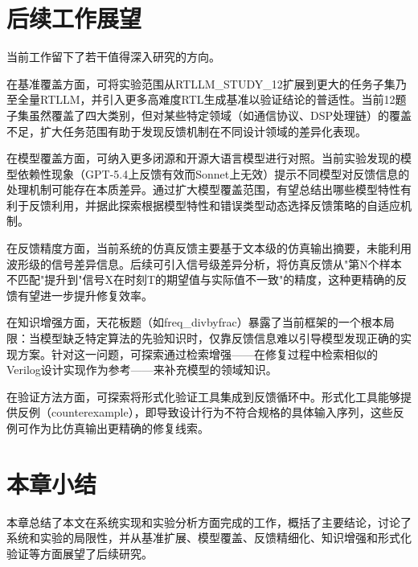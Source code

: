 \section{后续工作展望}

当前工作留下了若干值得深入研究的方向。

在基准覆盖方面，可将实验范围从RTLLM\_STUDY\_12扩展到更大的任务子集乃至全量RTLLM，并引入更多高难度RTL生成基准以验证结论的普适性。当前12题子集虽然覆盖了四大类别，但对某些特定领域（如通信协议、DSP处理链）的覆盖不足，扩大任务范围有助于发现反馈机制在不同设计领域的差异化表现。

在模型覆盖方面，可纳入更多闭源和开源大语言模型进行对照。当前实验发现的模型依赖性现象（GPT-5.4上反馈有效而Sonnet上无效）提示不同模型对反馈信息的处理机制可能存在本质差异。通过扩大模型覆盖范围，有望总结出哪些模型特性有利于反馈利用，并据此探索根据模型特性和错误类型动态选择反馈策略的自适应机制。

在反馈精度方面，当前系统的仿真反馈主要基于文本级的仿真输出摘要，未能利用波形级的信号差异信息。后续可引入信号级差异分析，将仿真反馈从"第N个样本不匹配"提升到"信号X在时刻T的期望值与实际值不一致"的精度，这种更精确的反馈有望进一步提升修复效率。

在知识增强方面，天花板题（如freq\_divbyfrac）暴露了当前框架的一个根本局限：当模型缺乏特定算法的先验知识时，仅靠反馈信息难以引导模型发现正确的实现方案。针对这一问题，可探索通过检索增强\cite{hdldebugger}——在修复过程中检索相似的Verilog设计实现作为参考——来补充模型的领域知识。

在验证方法方面，可探索将形式化验证工具集成到反馈循环中。形式化工具能够提供反例（counterexample），即导致设计行为不符合规格的具体输入序列，这些反例可作为比仿真输出更精确的修复线索。

\section{本章小结}

本章总结了本文在系统实现和实验分析方面完成的工作，概括了主要结论，讨论了系统和实验的局限性，并从基准扩展、模型覆盖、反馈精细化、知识增强和形式化验证等方面展望了后续研究。
